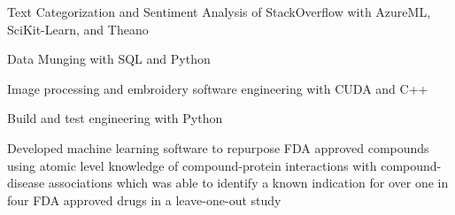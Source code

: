 \documentclass[letterpaper]{deedy-resume} %
\begin{document}
\begin{minipage}[t]{0.66\textwidth}
\sectionspace

\begin{tightitemize}
\item Text Categorization and Sentiment Analysis of StackOverflow with AzureML, SciKit-Learn, and Theano
\item Data Munging with SQL and Python
\end{tightitemize}

\sectionspace


\begin{tightitemize}
\item Image processing and embroidery software engineering with CUDA and C++
\item Build and test engineering with Python


\end{tightitemize}





\sectionspace %



\begin{tightitemize}
\item Developed machine learning software to repurpose FDA approved compounds using atomic level knowledge of compound-protein interactions with compound-disease associations  which was able to identify a known indication for over one in four FDA approved drugs in a leave-one-out study
\end{tightitemize}

\sectionspace %




\end{minipage}
\end{document}
